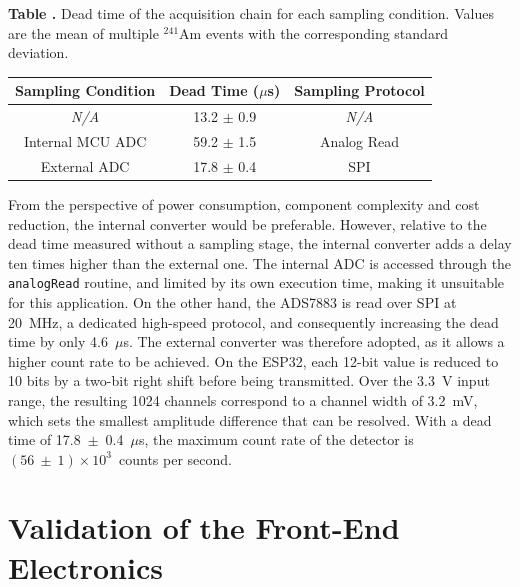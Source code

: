 \vspace{1em}
\label{tab:dead_time}
\noindent \textbf{Table \thetable.} Dead time of the acquisition chain for each sampling
condition. Values are the mean of multiple $^{241}$Am events with the corresponding standard
deviation.
\vspace{0.1em}
\begin{center}
\setlength{\tabcolsep}{22pt}
\renewcommand{\arraystretch}{1.3}
\begin{tabular}{ccc}
\hline
\textbf{Sampling Condition} & \textbf{Dead Time ($\mu$s)} & \textbf{Sampling Protocol} \\
\hline
\textit{N/A} & 13.2 $\pm$ 0.9 & \textit{N/A} \\
Internal MCU ADC & 59.2 $\pm$ 1.5 & Analog Read \\
External ADC & 17.8 $\pm$ 0.4 & SPI \\
\hline
\end{tabular}
\end{center}
\vspace{1em}

From the perspective of power consumption, component complexity and cost reduction, the internal converter would be preferable. However, relative to the dead time measured without a sampling stage, the internal converter adds a delay ten times higher than the external one. The internal ADC is accessed through the \texttt{analogRead} routine, and limited by its own execution time, making it unsuitable for this application. On the other hand, the ADS7883 is read over SPI at 20~MHz, a dedicated high-speed protocol, and consequently increasing the dead time by only 4.6~$\mu$s. The external converter was therefore adopted, as it allows a higher count rate to be achieved. On the ESP32, each 12-bit value is reduced to 10 bits by a two-bit right shift before being transmitted. Over the 3.3~V input range, the resulting 1024 channels correspond to a channel width of 3.2~mV, which sets the smallest amplitude difference that can be resolved. With a dead time of 17.8~$\pm$~0.4~$\mu$s, the maximum count rate of the detector is $(56~\pm~1)\times10^{3}$~counts per second.


\section{Validation of the Front-End Electronics}
\label{sec:frontend-validation}

